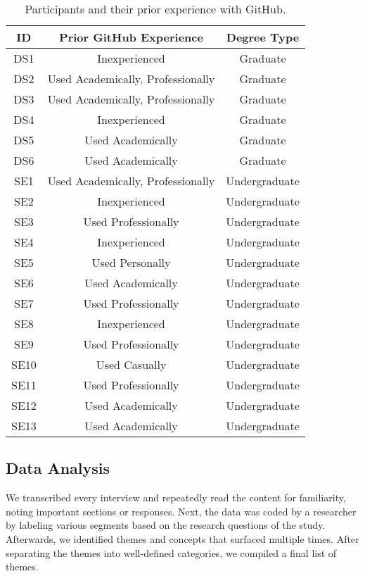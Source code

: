 \begin{table}[h]
    \vspace{1pt}
        \caption{Participants and their prior experience with GitHub.}\label{table:interviews:students}
    \vspace{1pt}
    \begin{center}
        \begin{tabular}{c | c | c}
            \hline
            ID & Prior GitHub Experience & Degree Type \\
            \hline
            DS1 & Inexperienced & Graduate \\ \hline
            DS2 & Used Academically, Professionally & Graduate \\ \hline
            DS3 & Used Academically, Professionally & Graduate \\ \hline
            DS4 & Inexperienced & Graduate \\ \hline
            DS5 & Used Academically & Graduate \\ \hline
            DS6 & Used Academically & Graduate \\ \hline
            SE1 & Used Academically, Professionally & Undergraduate \\ \hline
            SE2 & Inexperienced & Undergraduate \\ \hline
            SE3 & Used Professionally & Undergraduate \\ \hline
            SE4 & Inexperienced & Undergraduate \\ \hline
            SE5 & Used Personally & Undergraduate \\ \hline
            SE6 & Used Academically & Undergraduate \\ \hline
            SE7 & Used Professionally & Undergraduate \\ \hline
            SE8 & Inexperienced & Undergraduate \\ \hline
            SE9 & Used Professionally & Undergraduate \\ \hline
            SE10 & Used Casually & Undergraduate \\ \hline
            SE11 & Used Professionally & Undergraduate \\ \hline
            SE12 & Used Academically & Undergraduate \\ \hline
            SE13 & Used Academically & Undergraduate \\ \hline
        \end{tabular}
    \end{center}
\end{table}

\subsection{Data Analysis}
We transcribed every interview and repeatedly read the content for familiarity, noting important sections or responses. Next, the data was coded by a researcher by labeling various segments based on the research questions of the study. Afterwards, we identified themes and concepts that surfaced multiple times. After separating the themes into well-defined categories, we compiled a final list of themes.
